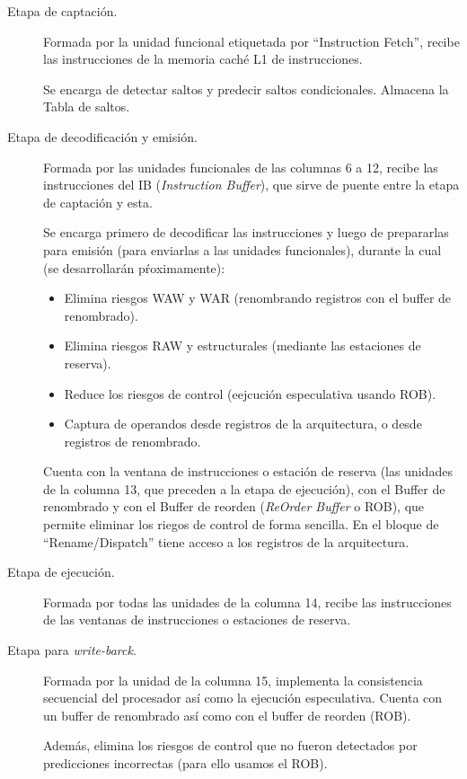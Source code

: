 \begin{description}
    \item [Etapa de captación.] Formada por la unidad funcional etiquetada por ``Instruction Fetch'', recibe las instrucciones de la memoria caché L1 de instrucciones.

        Se encarga de detectar saltos y predecir saltos condicionales. Almacena la Tabla de saltos.
    \item [Etapa de decodificación y emisión.] Formada por las unidades funcionales de las columnas 6 a 12, recibe las instrucciones del IB (\emph{Instruction Buffer}), que sirve de puente entre la etapa de captación y esta.

        Se encarga primero de decodificar las instrucciones y luego de prepararlas para emisión (para enviarlas a las unidades funcionales), durante la cual (se desarrollarán pŕoximamente):
        \begin{itemize}
            \item Elimina riesgos WAW y WAR (renombrando registros con el buffer de renombrado).
            \item Elimina riesgos RAW y estructurales (mediante las estaciones de reserva).
            \item Reduce los riesgos de control (eejcución especulativa usando ROB).
            \item Captura de operandos desde registros de la arquitectura, o desde registros de renombrado.
        \end{itemize}
        Cuenta con la ventana de instrucciones o estación de reserva (las unidades de la columna 13, que preceden a la etapa de ejecución), con el Buffer de renombrado y con el Buffer de reorden (\emph{ReOrder Buffer} o ROB), que permite eliminar los riegos de control de forma sencilla. En el bloque de ``Rename/Dispatch'' tiene acceso a los registros de la arquitectura.
    \item [Etapa de ejecución.] Formada por todas las unidades de la columna 14, recibe las instrucciones de las ventanas de instrucciones o estaciones de reserva.
    \item [Etapa para \emph{write-barck}.] Formada por la unidad de la columna 15, implementa la consistencia secuencial del procesador así como la ejecución especulativa. Cuenta con un buffer de renombrado así como con el buffer de reorden (ROB).

        Además, elimina los riesgos de control que no fueron detectados por predicciones incorrectas (para ello usamos el ROB).
\end{description}

